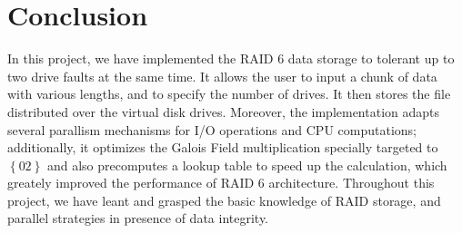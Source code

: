 \section{Conclusion}

In this project, we have implemented the RAID 6 data storage to tolerant up to two drive faults at the same time. It allows the user to input a chunk of data with various lengths, and to specify the number of drives. It then stores the file distributed over the virtual disk drives. Moreover, the implementation adapts several parallism mechanisms for I/O operations and CPU computations; additionally, it optimizes the Galois Field multiplication specially targeted to $\left\{02\right\}$ and also precomputes a lookup table to speed up the calculation, which greately improved the performance of RAID 6 architecture. Throughout this project, we have leant and grasped the basic knowledge of RAID storage, and parallel strategies in presence of data integrity.
